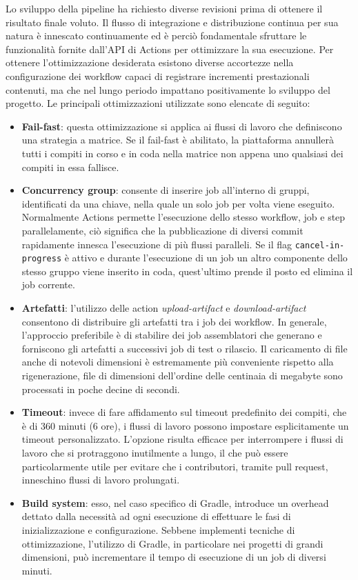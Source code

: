 Lo sviluppo della pipeline ha richiesto diverse revisioni prima di ottenere il risultato finale voluto. Il flusso di integrazione e distribuzione continua per sua natura è innescato continuamente ed è perciò fondamentale sfruttare le funzionalità fornite dall'API di Actions per ottimizzare la sua esecuzione. Per ottenere l'ottimizzazione desiderata esistono diverse accortezze nella configurazione dei workflow capaci di registrare incrementi prestazionali contenuti, ma che nel lungo periodo impattano positivamente lo sviluppo del progetto. Le principali ottimizzazioni utilizzate sono elencate di seguito:
\begin{itemize}
	\item \textbf{Fail-fast}: questa ottimizzazione si applica ai flussi di lavoro che definiscono una strategia a matrice. Se il fail-fast è abilitato, la piattaforma annullerà tutti i compiti in corso e in coda nella matrice non appena uno qualsiasi dei compiti in essa fallisce.
	\item \textbf{Concurrency group}: consente di inserire job all'interno di gruppi, identificati da una chiave, nella quale un solo job per volta viene eseguito. Normalmente Actions permette l'esecuzione dello stesso workflow, job e step parallelamente, ciò significa che la pubblicazione di diversi commit rapidamente  innesca l'esecuzione di più flussi paralleli. Se il flag \texttt{cancel-in-progress} è attivo e durante l'esecuzione di un job un altro componente dello stesso gruppo viene inserito in coda, quest'ultimo prende il posto ed elimina il job corrente.
	\item \textbf{Artefatti}: l'utilizzo delle action \textit{upload-artifact} e \textit{download-artifact} consentono di distribuire gli artefatti tra i job dei workflow. In generale, l'approccio preferibile è di stabilire dei job assemblatori che generano e forniscono gli artefatti a successivi job di test o rilascio. Il caricamento di file anche di notevoli dimensioni è estremamente più conveniente rispetto alla rigenerazione, file di dimensioni dell'ordine delle centinaia di megabyte sono processati in poche decine di secondi.
	\item \textbf{Timeout}: invece di fare affidamento sul timeout predefinito dei compiti, che è di 360 minuti (6 ore), i flussi di lavoro possono impostare esplicitamente un timeout personalizzato. L'opzione risulta efficace per interrompere i flussi di lavoro che si protraggono inutilmente a lungo, il che può essere particolarmente utile per evitare che i contributori, tramite pull request, inneschino flussi di lavoro prolungati.
	\item \textbf{Build system}: esso, nel caso specifico di Gradle, introduce un overhead dettato dalla necessità ad ogni esecuzione di effettuare le fasi di inizializzazione e configurazione. Sebbene implementi tecniche di ottimizzazione, l'utilizzo di Gradle, in particolare nei progetti di grandi dimensioni, può incrementare il tempo di esecuzione di un job di diversi minuti.
\end{itemize}

